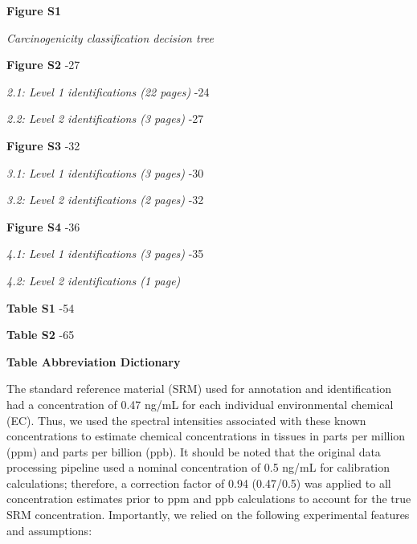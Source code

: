 \documentclass[
]{article}
\begin{document}
\vspace{2em}


\vspace{0.5em}

\fontsize{10}{11}\selectfont

\textbf{Figure S1} 

\quad \textit{Carcinogenicity classification decision tree} 

\textbf{Figure S2} -27

\quad \textit{2.1: Level 1 identifications (22 pages)} -24

\quad \textit{2.2: Level 2 identifications (3 pages)} -27

\textbf{Figure S3} -32

\quad \textit{3.1: Level 1 identifications (3 pages)} -30

\quad \textit{3.2: Level 2 identifications (2 pages)} -32

\textbf{Figure S4} -36

\quad \textit{4.1: Level 1 identifications (3 pages)} -35

\quad \textit{4.2: Level 2 identifications (1 page)} 

\textbf{Table S1} -54

\textbf{Table S2} -65

\textbf{Table Abbreviation Dictionary} 

\newpage

\newpage



\vspace{0.25em}


\vspace{0.5em}

\noindent The standard reference material (SRM) used for annotation and
identification had a concentration of 0.47 ng/mL for each individual
environmental chemical (EC). Thus, we used the spectral intensities
associated with these known concentrations to estimate chemical
concentrations in tissues in parts per million (ppm) and parts per
billion (ppb). It should be noted that the original data processing
pipeline used a nominal concentration of 0.5 ng/mL for calibration
calculations; therefore, a correction factor of 0.94 (0.47/0.5) was
applied to all concentration estimates prior to ppm and ppb calculations
to account for the true SRM concentration. Importantly, we relied on the
following experimental features and assumptions:
\end{document}
